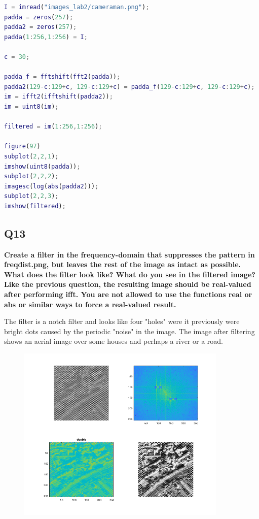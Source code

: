 \documentclass[oneside,a4paper]{article}
\begin{document}
\begin{lstlisting}[language=MATLAB]
I = imread("images_lab2/cameraman.png");
padda = zeros(257);
padda2 = zeros(257);
padda(1:256,1:256) = I;

c = 30;

padda_f = fftshift(fft2(padda));
padda2(129-c:129+c, 129-c:129+c) = padda_f(129-c:129+c, 129-c:129+c);
im = ifft2(ifftshift(padda2));
im = uint8(im);

filtered = im(1:256,1:256);

figure(97)
subplot(2,2,1);
imshow(uint8(padda));
subplot(2,2,2);
imagesc(log(abs(padda2)));
subplot(2,2,3);
imshow(filtered);

\end{lstlisting}


\subsection*{Q13}
\noindent \textbf{Create a filter in the frequency-domain that suppresses the pattern in freqdist.png, but leaves the rest of the image as intact as possible. What does the filter look like? What do you see in the filtered image? Like the previous question, the resulting image should be real-valued after performing ifft. You are not allowed to use the functions real or abs or similar ways to force a real-valued result.}

The filter is a notch filter and looks like four "holes" were it previously were bright dots caused by the periodic "noise" in the image. The image after filtering shows an aerial image over some houses and perhaps a river or a road. 

\begin{figure}[ht!]
\centering
\includegraphics[width=100mm]{figures/Q13.png}
\caption{}
\label{fig:Q13}
\end{figure}
\end{document}
